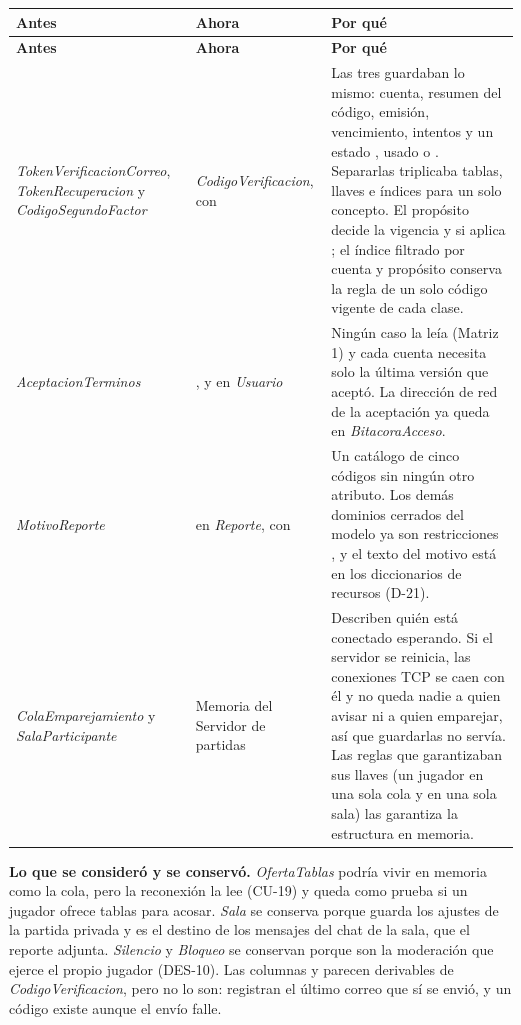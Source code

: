 \begin{center}\small
\begin{longtable}{|L{0.25\textwidth}|L{0.20\textwidth}|L{0.43\textwidth}|}
\hline
\textbf{Antes} & \textbf{Ahora} & \textbf{Por qué} \\ \hline
\endfirsthead
\hline
\textbf{Antes} & \textbf{Ahora} & \textbf{Por qué} \\ \hline
\endhead
\textit{TokenVerificacionCorreo}, \textit{TokenRecuperacion} y \textit{CodigoSegundoFactor} & \textit{CodigoVerificacion}, con  & Las tres guardaban lo mismo: cuenta, resumen del código, emisión, vencimiento, intentos y un estado , usado o . Separarlas triplicaba tablas, llaves e índices para un solo concepto. El propósito decide la vigencia y si aplica ; el índice filtrado por cuenta y propósito conserva la regla de un solo código vigente de cada clase. \\ \hline
\textit{AceptacionTerminos} & ,  y  en \textit{Usuario} & Ningún caso la leía (Matriz 1) y cada cuenta necesita solo la última versión que aceptó. La dirección de red de la aceptación ya queda en \textit{BitacoraAcceso}. \\ \hline
\textit{MotivoReporte} &  en \textit{Reporte}, con  & Un catálogo de cinco códigos sin ningún otro atributo. Los demás dominios cerrados del modelo ya son restricciones , y el texto del motivo está en los diccionarios de recursos (\mbox{D-21}). \\ \hline
\textit{ColaEmparejamiento} y \textit{SalaParticipante} & Memoria del Servidor de partidas & Describen quién está conectado esperando. Si el servidor se reinicia, las conexiones TCP se caen con él y no queda nadie a quien avisar ni a quien emparejar, así que guardarlas no servía. Las reglas que garantizaban sus llaves (un jugador en una sola cola y en una sola sala) las garantiza la estructura en memoria. \\ \hline
\end{longtable}
\end{center}

\textbf{Lo que se consideró y se conservó.} \textit{OfertaTablas} podría vivir en memoria como la cola, pero la reconexión la lee (\mbox{CU-19}) y queda como prueba si un jugador ofrece tablas para acosar. \textit{Sala} se conserva porque guarda los ajustes de la partida privada y es el destino de los mensajes del chat de la sala, que el reporte adjunta. \textit{Silencio} y \textit{Bloqueo} se conservan porque son la moderación que ejerce el propio jugador (\mbox{DES-10}). Las columnas  y  parecen derivables de \textit{CodigoVerificacion}, pero no lo son: registran el último correo que sí se envió, y un código existe aunque el envío falle.

